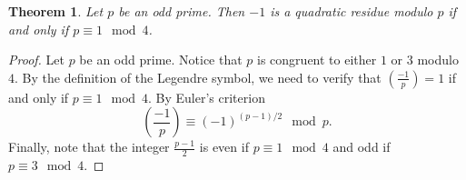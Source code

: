 \documentclass[12pt]{article}
\newtheorem*{thm}{Theorem}
\theoremstyle{definition}
\begin{document}
\begin{thm}
Let $p$ be an odd prime. Then $-1$ is a quadratic residue modulo $p$ if and only if $p\equiv 1 \mod 4$.
\end{thm}
\begin{proof}
Let $p$ be an odd prime. Notice that $p$ is congruent to either $1$ or $3$ modulo $4$. By the definition of the Legendre symbol, we need to verify that 
$\displaystyle \left(\frac{-1}{p}\right) = 1$ if and only if $p\equiv 1 \mod 4$. By Euler's criterion $$\left(\frac{-1}{p}\right)\equiv (-1)^{(p-1)/2} \mod p.$$
Finally, note that the integer $\displaystyle \frac{p-1}{2}$ is even if $p\equiv 1 \mod 4$ and odd if $p\equiv 3 \mod 4$.
\end{proof}
\end{document}
